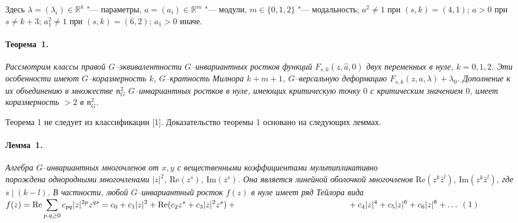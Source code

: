 Здесь $\lambda=(\lambda_i)\in\mathbb{R}^k$ "--- параметры, $a=(a_i)\in\mathbb{R}^m$ "--- модули, $m\in\{0,1,2\}$ "--- модальность;
$a^2\ne 1$ при $(s,k)=(4,1)$; $a>0$ при $s\ne k+3$;
$a_1^2\ne1$ при $(s,k)=(6,2)$;
$a_1>0$ иначе.

\smallskip
\paragraph{Теорема~1.}
{\it
Рассмотрим классы {\em правой} $G$--эк\-ви\-ва\-лент\-ности $G$--ин\-ва\-ри\-ант\-ных ростков функций $F_{s,k}(z,\hat a,0)$ двух переменных в нуле, $k=0,1,2$.
Эти особенности имеют $G$--кораз\-мер\-ность $k$, $G$--кратность Милнора $k+m+1$, $G$--версальную деформацию $F_{s,k}(z,a,\lambda)+\lambda_0$.
Дополнение к их объединению в множестве $\mathfrak{n}^2_G
$
$G$--инва\-ри\-ант\-ных ростков в нуле, имеющих критическую точку $0$ с критическим значением $0$, имеет коразмерность $>2$ в $\mathfrak{n}_G^2$.}

Теорема 1 не следует из классификации [1].
Доказательство теоремы 1 основано на следующих леммах.

\smallskip
\paragraph{Лемма~1.}
{\it Алгебра $G$--инвариантных многочленов от $x,y$ с вещественными коэффициентами мультипликативно\\ порождена однородными многочленами $|z|^2$, $\mathrm{Re}(z^s)$, $\mathrm{Im}(z^s)$.
Она является линейной оболочкой
многочленов $\mathrm{Re}(z^k \bar{z}^l)$, $\mathrm{Im}(z^k \bar{z}^l)$, где $s\mid(k - l)$.
В частности, любой $G$--инва\-ри\-ант\-ный росток $f(z)$ в нуле имеет ряд Тейлора вида
\medskip\\ $
f(z)=\mathrm{Re} \displaystyle
\sum_{p,q\ge0} c_{pq}|z|^{2p}z^{qs}
=c_0+c_1|z|^2
+\mathrm{Re}(c_2 z^s+c_3 |z|^2 z^s)+\smallskip\\
\phantom{oooooooooooi f(z)=c_0+c_1|z|^2}
+c_4|z|^4+c_5|z|^6+c_6|z|^8+\ldots
$
\hfill $(1)$
}

